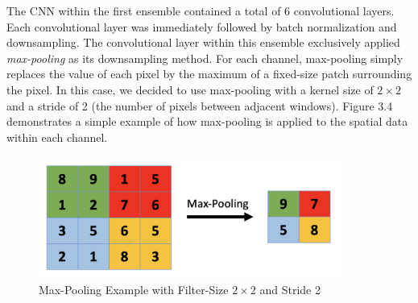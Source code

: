 \documentclass [MAS] {uclathes}
\begin{document}
The CNN within the first ensemble contained a total of 6 convolutional layers. Each convolutional layer was immediately followed by batch normalization and downsampling. The convolutional layer within this ensemble exclusively applied \textit{max-pooling} as its downsampling method. For each channel, max-pooling simply replaces the value of each pixel by the maximum of a fixed-size patch surrounding the pixel. In this case, we decided to use max-pooling with a kernel size of $2 \times 2$ and a stride of 2 (the number of pixels between adjacent windows). Figure 3.4 demonstrates a simple example of how max-pooling is applied to the spatial data within each channel. 

\begin{figure}[h]
\centering
\includegraphics[height = 40mm, width= 100mm]{imgs/maxpool.png}
\caption{Max-Pooling Example with Filter-Size $2 \times 2$ and Stride 2}
\label{fig:maxpool}
\end{figure}
\end{document}
